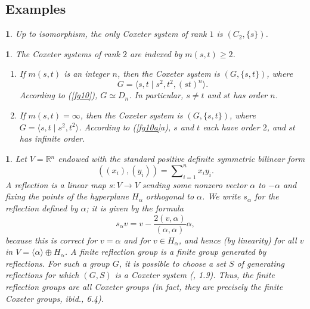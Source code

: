 \documentclass[a4paper,11pt,final]{memoir}%
\newtheorem{plain}[X]{}
\theoremstyle{nonumberplain}
\begin{document}
\subsection{Examples}

\begin{plain}
\label{fg12}Up to isomorphism, the only Coxeter system of rank $1$ is
$(C_{2},\{s\})$.
\end{plain}

\begin{plain}
\label{fg13}The Coxeter systems of rank $2$ are indexed by $m(s,t)\geq2$.

\begin{enumerate}
\item If $m(s,t)$ is an integer $n$, then the Coxeter system is $(G,\{s,t\})$,
where
\[
G=\langle s,t\mid s^{2},t^{2},(st)^{n}\rangle\text{.}%
\]
According to (\ref{fg10}), $G\simeq D_{n}$. In particular, $s\neq t$ and $st$
has order $n$.

\item If $m(s,t)=\infty$, then the Coxeter system is $(G,\{s,t\})$, where
$G=\langle s,t\mid s^{2},t^{2}\rangle$. According to (\ref{fg10a}a), $s$ and
$t$ each have order $2$, and $st$ has infinite order.
\end{enumerate}
\end{plain}

\begin{plain}
\label{fg14}Let $V=\mathbb{R}{}^{n}$ endowed with the standard positive
definite symmetric bilinear form%
\[
((x_{i}),(y_{i}))=\sum\nolimits_{i=1}^{n}x_{i}y_{i}.
\]
A \emph{reflection}%
is a linear map $s\colon V\rightarrow V$ sending some nonzero vector $\alpha$
to $-\alpha$ and fixing the points of the hyperplane $H_{\alpha}$ orthogonal
to $\alpha$. We write $s_{\alpha}$ for the reflection defined by $\alpha$; it
is given by the formula%
\[
s_{\alpha}v=v-\frac{2(v,\alpha)}{(\alpha,\alpha)}\alpha,
\]
because this is correct for $v=\alpha$ and for $v\in H_{\alpha}$, and hence
(by linearity) for all $v$ in $V=\langle\alpha\rangle\oplus H_{\alpha}$. A
\emph{finite reflection group}%
%
is a finite group generated by reflections. For such a group $G$, it is
possible to choose a set $S$ of generating reflections for which $(G,S)$ is a
Coxeter system (\cite{humphreys1990}, 1.9). Thus, the finite reflection groups
are all Coxeter groups (in fact, they are precisely the finite Coxeter groups,
ibid., 6.4).
\end{plain}
\end{document}
